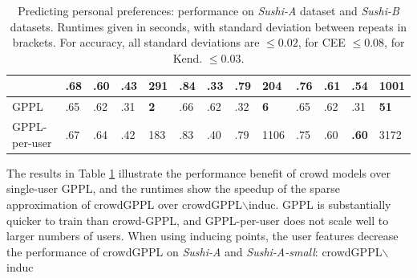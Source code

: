 \begin{table}
\begin{tabularx}{\textwidth}{| p{1.1cm} | X | X | X | p{0.55cm} | X | X | X | p{0.7cm} | X | X | X | p{0.7cm} |}
& .68 & .60 & .43 & 291 %
& .84 & \textbf{.33} & .79 & 204 %
& .76 & .61 & .54 & 1001
\\ 
\hline 
GPPL & .65 & .62 & .31 & \textbf{2} %
& .66 & .62 & .32 & \textbf{6} %
& .65 & .62 & .31 & \textbf{51}
\\
GPPL-per-user & .67 & .64 & .42 & 183 %
& .83 & .40 & .79 & 1106 & .75 & .60 & \textbf{.60} & 3172 %
\\
\hline
\end{tabularx}
\caption{Predicting personal preferences: performance on \emph{Sushi-A} dataset and \emph{Sushi-B} datasets.
Runtimes given in seconds, with standard deviation between repeats in brackets.
For accuracy, all standard deviations are $\leq 0.02$, for CEE $\leq 0.08$, for Kend. $\leq 0.03$.
 }
\label{tab:sushi}
\end{table}
The results in Table \ref{tab:sushi} 
illustrate the performance benefit of crowd models over single-user GPPL, and
the runtimes 
show the speedup of the sparse approximation of crowdGPPL over crowdGPPL$\backslash$induc.
GPPL is substantially quicker to train than crowd-GPPL, and GPPL-per-user does not scale well to larger numbers
of users.
 When using inducing points, the user features decrease the performance of crowdGPPL on \emph{Sushi-A} and \emph{Sushi-A-small}: crowdGPPL$\backslash$induc

